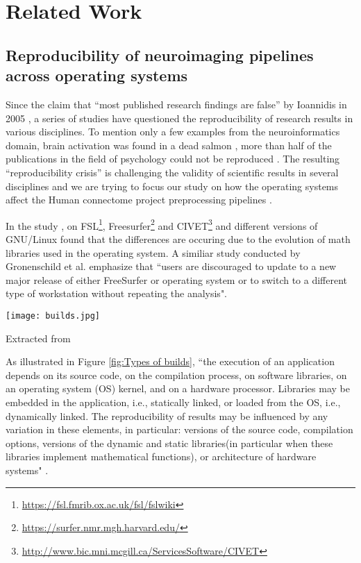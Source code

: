 \chapter{Related Work}

\section{Reproducibility of neuroimaging pipelines across operating systems}
Since the claim that ``most published research findings are false” by Ioannidis in 2005 \cite{10.1371/journal.pmed.0020124}, a series of studies have questioned the reproducibility of research results in various disciplines. To mention only a few examples from the neuroinformatics domain, brain activation was found in a dead salmon \cite{BENNETT2009S125}, more than half of the publications in the field of psychology could not be reproduced \cite{aac4716}. The resulting “reproducibility crisis” is challenging the validity of scientific results in several disciplines and we are trying to focus our study on how the operating systems affect the Human connectome project preprocessing pipelines \cite{Gla13}.
 
In the study \cite{Gla15}, on FSL\footnote{\url{https://fsl.fmrib.ox.ac.uk/fsl/fslwiki}}, Freesurfer\footnote{\url{https://surfer.nmr.mgh.harvard.edu/}} and CIVET\footnote{\url{http://www.bic.mni.mcgill.ca/ServicesSoftware/CIVET}} and different versions of GNU/Linux found that the differences are occuring due to the evolution of math libraries used in the operating system. A similiar study conducted by Gronenschild et al. \cite{10.1371/journal.pone.0038234} emphasize that ``users are discouraged to update to a new major release of either FreeSurfer or operating system or to switch to a different type of workstation without repeating the analysis".\\

\begin{center}
\texttt{[image: builds.jpg]}
\label{fig:Types of builds}
\caption*{Extracted from \cite{Gla15}}
\end{center}

As illustrated in Figure \ref{fig:Types of builds}, ``the execution of an application depends on its source code, on the compilation process, on software libraries, on an operating system (OS) kernel, and on a hardware processor. Libraries may be embedded in the application, i.e., statically linked, or loaded from the OS, i.e., dynamically linked. The reproducibility of results may be influenced by any variation in these elements, in particular: versions of the source code, compilation options, versions of the dynamic and static libraries(in particular when these libraries implement mathematical functions), or architecture of hardware systems" \cite{Gla15}. \\

